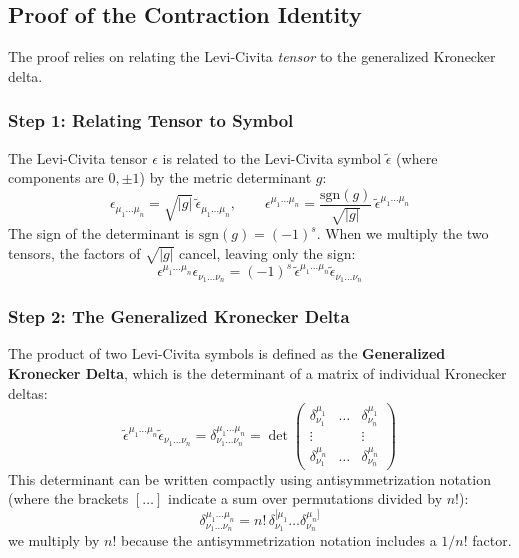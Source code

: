 \documentclass[11pt, a4paper]{report}
\begin{document}
\subsection*{Proof of the Contraction Identity}

The proof relies on relating the Levi-Civita \emph{tensor} to the generalized Kronecker delta.

\subsubsection*{Step 1: Relating Tensor to Symbol}
The Levi-Civita tensor $\epsilon$ is related to the Levi-Civita symbol $\tilde{\epsilon}$ (where components are $0, \pm 1$) by the metric determinant $g$:
\begin{equation}
    \epsilon_{\mu_1\dots\mu_n} = \sqrt{|g|} \, \tilde{\epsilon}_{\mu_1\dots\mu_n}, \quad \quad \epsilon^{\mu_1\dots\mu_n} = \frac{\mathrm{sgn}(g)}{\sqrt{|g|}} \, \tilde{\epsilon}^{\mu_1\dots\mu_n}
\end{equation}
The sign of the determinant is $\mathrm{sgn}(g) = (-1)^s$. When we multiply the two tensors, the factors of $\sqrt{|g|}$ cancel, leaving only the sign:
\begin{equation}
    \epsilon^{\mu_1\dots\mu_n} \epsilon_{\nu_1\dots\nu_n} = (-1)^s \, \tilde{\epsilon}^{\mu_1\dots\mu_n} \tilde{\epsilon}_{\nu_1\dots\nu_n}
\end{equation}

\subsubsection*{Step 2: The Generalized Kronecker Delta}
The product of two Levi-Civita symbols is defined as the \textbf{Generalized Kronecker Delta}, which is the determinant of a matrix of individual Kronecker deltas:
\begin{equation}
    \tilde{\epsilon}^{\mu_1\dots\mu_n} \tilde{\epsilon}_{\nu_1\dots\nu_n} = \delta^{\mu_1\dots\mu_n}_{\nu_1\dots\nu_n} = 
    \det \begin{pmatrix} 
    \delta^{\mu_1}_{\nu_1} & \dots & \delta^{\mu_1}_{\nu_n} \\
    \vdots & & \vdots \\
    \delta^{\mu_n}_{\nu_1} & \dots & \delta^{\mu_n}_{\nu_n}
    \end{pmatrix}
\end{equation}
This determinant can be written compactly using antisymmetrization notation (where the brackets $[\dots]$ indicate a sum over permutations divided by $n!$):
\begin{equation}
    \delta^{\mu_1\dots\mu_n}_{\nu_1\dots\nu_n} = n! \, \delta^{[\mu_1}_{\nu_1} \dots \delta^{\mu_n]}_{\nu_n}
\end{equation}
we multiply by $n!$ because the antisymmetrization notation includes a $1/n!$ factor. 
\end{document}
